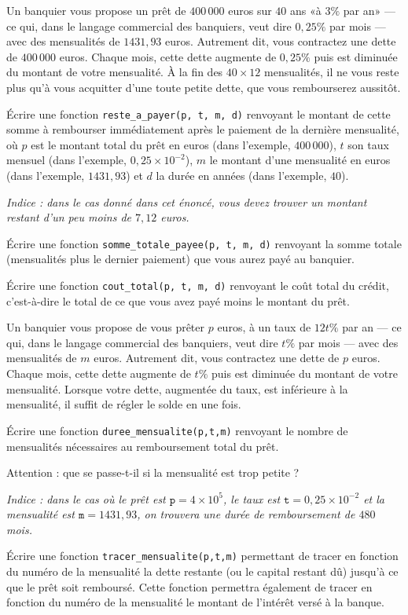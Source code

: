 
Un banquier vous  propose un prêt de $400\,000$ euros  sur $40$ ans «à
$3\%$ par  an» ---  ce qui, dans  le langage commercial  des banquiers,
veut  dire $0,25\%$  par mois  ---  avec des  mensualités de  $1431,93$
euros.  Autrement  dit,  vous   contractez  une  dette  de  $400\,000$
euros. Chaque mois, cette dette  augmente de $0,25\%$ puis est diminuée
du  montant  de  votre  mensualité.  À  la  fin  des  $40  \times  12$
mensualités, il  ne vous  reste plus qu'à  vous acquitter  d'une toute
petite dette, que vous rembourserez aussitôt.


\question{} Écrire  une fonction  \texttt{reste\_a\_payer(p, t,  m, d)}
renvoyant  le montant  de cette  somme à  rembourser  immédiatement
après le paiement de la dernière
mensualité, où  $p$ est le  montant total du  prêt en euros (dans l'exemple, $400\,000$), $t$ son  taux mensuel (dans l'exemple, 
$0,25 \times 10^{-2}$), $m$ le montant d'une mensualité en euros (dans l'exemple, $1431,93$) et $d$ la
durée en années (dans l'exemple, $40$).

\emph{Indice : dans le cas donné dans cet énoncé, vous devez trouver un montant
restant d'un peu moins de $7,12$ euros.}


\question{} Écrire une fonction \texttt{somme\_totale\_payee(p, t, m,
  d)} renvoyant la somme totale (mensualités plus le dernier
paiement) que vous aurez payé au banquier.


\question{}Écrire une fonction \texttt{cout\_total(p, t, m, d)} renvoyant
  le coût total  du crédit, c'est-à-dire le total de  ce que vous avez
  payé moins le montant du prêt.
  
Un banquier vous propose de vous prêter $p$ euros, à un taux de $12t\%$ par an ---  ce qui, dans  le langage commercial  des banquiers,
veut  dire $t\%$  par mois  --- avec des  mensualités de  $m$ euros. Autrement  dit,  vous   contractez  une  dette  de  $p$
euros. Chaque mois, cette dette  augmente de $t\%$ puis est diminuée du  montant  de  votre  mensualité. Lorsque votre dette, augmentée du taux, est inférieure à la mensualité, il suffit de régler le solde en une fois.

\question{} \'Ecrire une fonction \texttt{duree\_mensualite(p,t,m)} renvoyant le nombre de mensualités nécessaires au remboursement total du prêt.

\question{} Attention : que se passe-t-il si la mensualité est trop petite ? 

\emph{Indice : dans le cas où le prêt est $\texttt{p}=4\times10^5$, le taux est $\texttt{t}=0,25\times10^{-2}$ et la mensualité est $\texttt{m}=1431,93$, on trouvera une durée de remboursement de $480$ mois.}

\question{} \'Ecrire une fonction \texttt{tracer\_mensualite(p,t,m)} permettant de tracer en fonction du numéro de la mensualité la dette restante (ou le capital restant dû) jusqu'à ce que le prêt soit remboursé. Cette fonction permettra également de tracer en fonction du numéro de la mensualité le montant de l'intérêt versé à la banque. 
